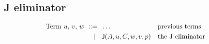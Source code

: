 \subsection{J eliminator}
\label{sec:j-elim}

\begin{align*}
  \text{Term $u$, $v$, $w$}
    \ \mathrel{{:}{:}{=}}\    {}& \ldots                        && \text{previous terms} \\
    \ \mid\ \  {}& \mathsf{J}(A,u,C,w,v,p) && \text{the J eliminator}
\end{align*}

\newcommand{\rlTermJ}{\referTo{term-j}{rul:term-j}}
\newcommand{\showTermJ}{%
  \infer[\rulename{term-j}] %
  {\istype{\G}{\A} \\
   \isterm{\G}{\uu}{\A} \\
   \istype
    {\ctxextend
      {\ctxextend{\G}{\A}}
      {\Id
        {\subst{\A}{\sbweak{\G}{\A}}}
        {\subst{\uu}{\sbweak{\G}{\A}}}
        {\var{0}}}
    }
    {\C} \\
   \isterm
    {\G}
    {\ww}
    {\subst
      {\subst
        {\C}
        {\sbshift
          {\G}
          {\Id
            {\subst{\A}{\sbweak{\G}{\A}}}
            {\subst{\uu}{\sbweak{\G}{\A}}}
            {\var{0}}
          }
          {\sbzero{\G}{\A}{\uu}}
        }
      }
      {\sbzero{\G}{\Id{\A}{\uu}{\uu}}{\refl{\A} \uu}}
    } \\
   \isterm{\G}{\vv}{\A} \\
   \isterm{\G}{\p}{\Id{\A}{\uu}{\vv}}
  }
  {\isterm{\G}
    {\J{\A}{\uu}{\C}{\ww}{\vv}{\p}}
    {\subst
      {\subst
        {\C}
        {\sbshift
          {\G}
          {\Id
            {\subst{\A}{\sbweak{\G}{\A}}}
            {\subst{\uu}{\sbweak{\G}{\A}}}
            {\var{0}}
          }
          {\sbzero{\G}{\A}{\vv}}
        }
      }
      {\sbzero{\G}{\Id{\A}{\uu}{\vv}}{\p}}
    }
  }
}

